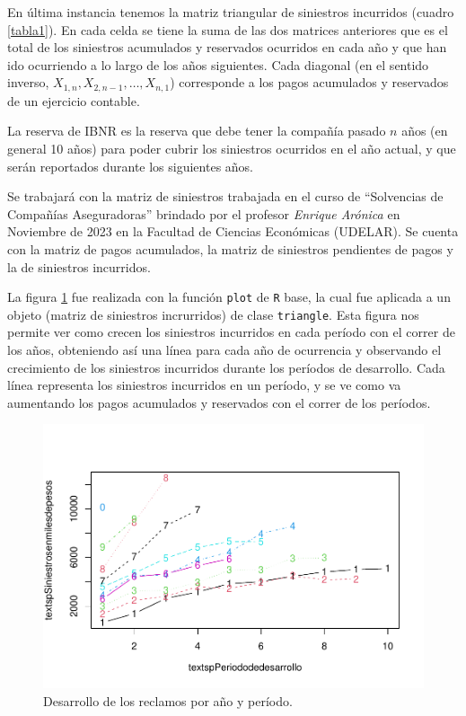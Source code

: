 \documentclass[
  12pt,
]{article}
\begin{document}
En última instancia tenemos la matriz triangular de siniestros
incurridos (cuadro \ref{tabla1}). En cada celda se tiene la suma de las
dos matrices anteriores que es el total de los siniestros acumulados y
reservados ocurridos en cada año y que han ido ocurriendo a lo largo de
los años siguientes. Cada diagonal (en el sentido inverso,
\(X_{1,n}, X_{2,n-1}, \ldots , X_{n,1}\)) corresponde a los pagos
acumulados y reservados de un ejercicio contable.

La reserva de IBNR es la reserva que debe tener la compañía pasado \(n\)
años (en general 10 años) para poder cubrir los siniestros ocurridos en
el año actual, y que serán reportados durante los siguientes años.

Se trabajará con la matriz de siniestros trabajada en el curso de
``Solvencias de Compañías Aseguradoras'' brindado por el profesor
\textit{Enrique Arónica} en Noviembre de 2023 en la Facultad de Ciencias
Económicas (UDELAR). Se cuenta con la matriz de pagos acumulados, la
matriz de siniestros pendientes de pagos y la de siniestros incurridos.

La figura \ref{triangle} fue realizada con la función \texttt{plot} de
\texttt{R} base, la cual fue aplicada a un objeto (matriz de siniestros
incrurridos) de clase \texttt{triangle}. Esta figura nos permite ver
como crecen los siniestros incurridos en cada período con el correr de
los años, obteniendo así una línea para cada año de ocurrencia y
observando el crecimiento de los siniestros incurridos durante los
períodos de desarrollo. Cada línea representa los siniestros incurridos
en un período, y se ve como va aumentando los pagos acumulados y
reservados con el correr de los períodos.

\begin{figure}
\centering
\includegraphics{informe_files/figure-latex/unnamed-chunk-4-1.pdf}
\caption{\label{triangle} Desarrollo de los reclamos por año y período.}
\end{figure}
\end{document}
